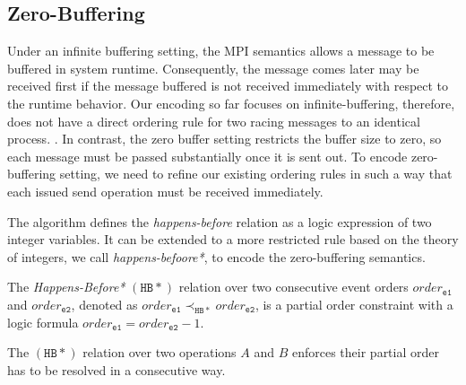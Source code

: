\subsection{Zero-Buffering}

Under an infinite buffering setting, the MPI semantics allows a message to be buffered in system runtime. Consequently, the message comes later may be received first if the message buffered is not received immediately with respect to the runtime behavior. Our encoding so far focuses on infinite-buffering, therefore, does not have a direct ordering rule for two racing messages to an identical process. 
. In contrast, the zero buffer setting restricts the buffer size to zero, so each message must be passed substantially once it is sent out. To encode zero-buffering setting, we need to refine our existing ordering rules in such a way that each issued send operation must be received immediately. 



The algorithm defines the \textit{happens-before} relation as a logic expression of two integer variables. It can be extended to a more restricted rule based on the theory of integers, we call \textit{happens-befoore*}, to encode the zero-buffering semantics. 

\begin{definition}
The \emph{Happens-Before*} $(\mathtt{HB*})$ relation over two consecutive event orders $\mathit{order}_\mathtt{e1}$ and $\mathit{order}_\mathtt{e2}$, denoted as
$\mathit{order}_\mathtt{e1} \mathrm{\prec_\mathtt{HB*}} \mathit{order}_\mathtt{e2}$, is a partial order constraint with a logic formula $\mathit{order}_\mathtt{e1} =  \mathit{order}_\mathtt{e2} - 1$.
\label{def:hb*}
\end{definition}

The $(\mathtt{HB*})$ relation over two operations $A$ and $B$ enforces their partial order has to be resolved in a consecutive way. 

